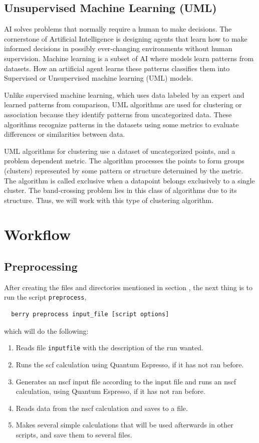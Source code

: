 \documentclass[a4paper,12pt]{report}
\begin{document}
\section{Unsupervised Machine Learning (UML)}

AI solves problems that normally require a human to make decisions.
The cornerstone of Artificial Intelligence is designing agents that learn how to make informed decisions in possibly ever-changing environments without human supervision. Machine learning is a subset of AI where models learn patterns from datasets.
How an artificial agent learns these patterns classifies them into Supervised or Unsupervised machine learning (UML) models.

Unlike supervised machine learning, which uses data labeled by an expert and learned patterns from comparison, UML algorithms are used for clustering or association because they identify patterns from uncategorized data.
These algorithms recognize patterns in the datasets using some metrics to evaluate differences or similarities between data.

UML algorithms for clustering use a dataset of uncategorized points, and a  problem dependent metric.
The algorithm processes the points to form groups (clusters) represented by some pattern or structure determined by the metric.
The algorithm is called exclusive when a datapoint belongs exclusively to a single cluster.
The band-crossing problem lies in this class of algorithms due to its structure.
Thus, we will work with this type of clustering algorithm.






\chapter{Workflow}\label{ch:workflow}



\section{Preprocessing}\label{sec:preprocessing}
 After creating the files and directories mentioned in section , the next thing is
 to run the script \texttt{preprocess},
 \begin{verbatim}
  berry preprocess input_file [script options]
 \end{verbatim}
 which will do the following:
 \begin{enumerate}
  \item Reads file \texttt{inputfile} with the description of the run wanted.
  \item Runs the scf calculation using {\sc Quantum Espresso}, if it has not ran before.
  \item Generates an nscf input file according to the input file and runs an nscf calculation,
  using {\sc Quantum Espresso}, if it has not ran before.
  \item Reads data from the nscf calculation and saves to a file.
  \item Makes several simple calculations that will be used afterwards in other scripts,
  and save them to several files.
 \end{enumerate}
\end{document}

